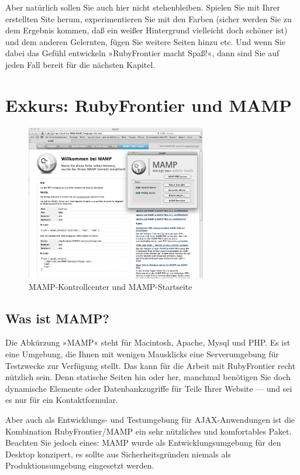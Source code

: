 \documentclass[11pt]{report}
\begin{document}
Aber natürlich sollen Sie auch hier nicht stehenbleiben. Spielen Sie
mit Ihrer erstellten Site herum, experimentieren Sie mit den Farben
(sicher werden Sie zu dem Ergebnis kommen, daß ein weißer Hintergrund
vielleicht doch schöner ist) und dem anderen Gelernten, fügen Sie
weitere Seiten hinzu etc. Und wenn Sie dabei das Gefühl entwickeln
»RubyFrontier macht Spaß!«, dann sind Sie auf jeden Fall bereit für
die nächsten Kapitel.
\chapter{Exkurs: RubyFrontier und MAMP}
\label{sec-2-2}


\begin{figure}[h!]
\centering
\includegraphics[width=0.7\textwidth]{./images/mamp01.png}
\caption{\label{mamp01}MAMP-Kontrollcenter und MAMP-Startseite}
\end{figure}
\section{Was ist MAMP?}
\label{sec-2-2-1}


Die Abkürzung »MAMP« steht für Macintosh, Apache, Mysql und PHP. Es
ist eine Umgebung, die Ihnen mit wenigen Mausklicks eine
Serverumgebung für Testzwecke zur Verfügung stellt. Das kann für die
Arbeit mit RubyFrontier recht nützlich sein. Denn statische Seiten hin
oder her, manchmal benötigen Sie doch dynamische Elemente oder
Datenbankzugriffe für Teile Ihrer Website — und sei es nur für ein
Kontaktformular.

Aber auch als Entwicklungs- und Testumgebung für AJAX-Anwendungen ist
die Kombination RubyFrontier/MAMP ein sehr nützliches und komfortables
Paket. Beachten Sie jedoch eines: MAMP wurde als Entwicklungsumgebung
für den Desktop konzipert, es sollte aus Sicherheitsgründen niemals
als Produktionsumgebung eingesetzt werden.
\end{document}
